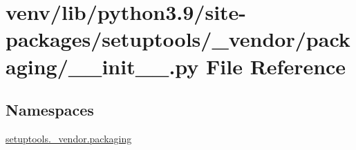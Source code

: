 \hypertarget{venv_2lib_2python3_89_2site-packages_2setuptools_2__vendor_2packaging_2____init_____8py}{}\section{venv/lib/python3.9/site-\/packages/setuptools/\+\_\+vendor/packaging/\+\_\+\+\_\+init\+\_\+\+\_\+.py File Reference}
\label{venv_2lib_2python3_89_2site-packages_2setuptools_2__vendor_2packaging_2____init_____8py}
\subsection*{Namespaces}
\begin{DoxyCompactItemize}
\item 
 \hyperlink{namespacesetuptools_1_1__vendor_1_1packaging}{setuptools.\+\_\+vendor.\+packaging}
\end{DoxyCompactItemize}
